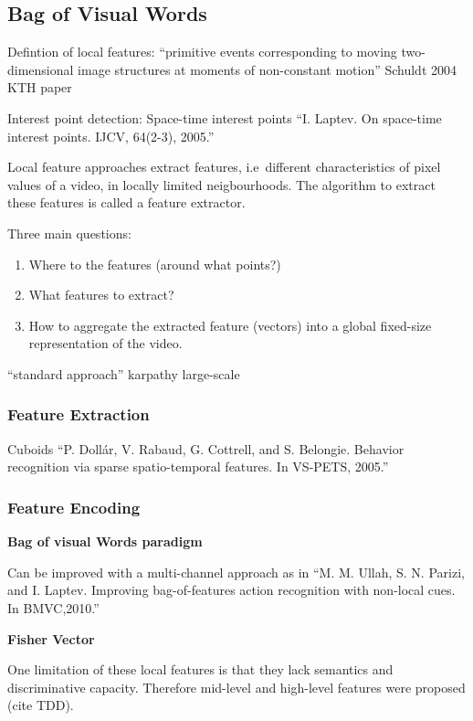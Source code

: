 \subsection{Bag of Visual Words}

Defintion of local features: ``primitive events corresponding to moving two-dimensional image structures at moments of non-constant motion'' Schuldt 2004 KTH paper

Interest point detection: Space-time interest points ``I. Laptev. On space-time interest points. IJCV, 64(2-3), 2005.''

Local feature approaches extract features, i.e\ different characteristics of pixel values of a video, in locally limited neigbourhoods.
The algorithm to extract these features is called a feature extractor.

Three main questions:
\begin{enumerate}
    \item Where to the features (around what points?)
    \item What features to extract?
    \item How to aggregate the extracted feature (vectors) into a global fixed-size representation of the video.
\end{enumerate}

``standard approach'' karpathy large-scale

\subsubsection{Feature Extraction}

Cuboids ``P. Dollár, V. Rabaud, G. Cottrell, and S. Belongie. Behavior recognition via sparse spatio-temporal features. In VS-PETS, 2005.''

\subsubsection{Feature Encoding}

\textbf{Bag of visual Words paradigm}

Can be improved with a multi-channel approach as in ``M. M. Ullah, S. N. Parizi, and I. Laptev. Improving bag-of-features action recognition with non-local cues. In BMVC,2010.''

\textbf{Fisher Vector}

One limitation of these local features is that they lack semantics and discriminative capacity. Therefore mid-level and high-level features were proposed (cite TDD).

